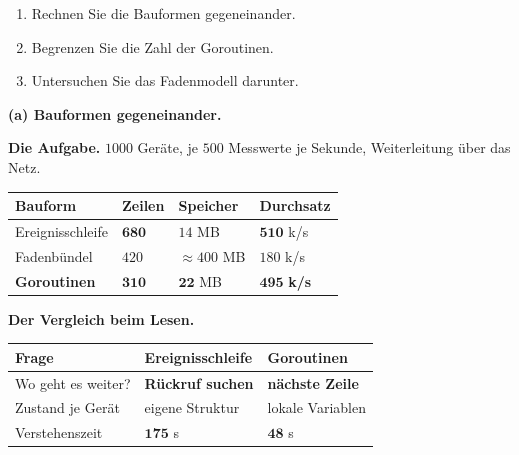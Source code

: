 \begin{aufgabe}
\begin{enumerate}[label=(\alph*)]
\item Rechnen Sie die Bauformen gegeneinander.
\item Begrenzen Sie die Zahl der Goroutinen.
\item Untersuchen Sie das Fadenmodell darunter.
\end{enumerate}

\loesung
\textbf{(a) Bauformen gegeneinander.}

\textbf{Die Aufgabe.} $1000$ Geräte, je $500$ Messwerte je Sekunde, Weiterleitung über das Netz.

\begin{center}
{\small
\renewcommand{\arraystretch}{1.45}
\begin{tabular}{@{}P{2.8cm}P{2.0cm}P{2.0cm}P{2.0cm}@{}}
\toprule
\textbf{Bauform} & \textbf{Zeilen} & \textbf{Speicher} & \textbf{Durchsatz}\\
\midrule
Ereignisschleife & $\mathbf{680}$ & \textcolor{gruen}{$14$ MB} & $\mathbf{510}$ k/s\\
Fadenbündel & $420$ & \textcolor{akzent}{$\approx400$ MB} & $180$ k/s\\
\textbf{Goroutinen} & $\mathbf{310}$ & $\mathbf{22}$ MB & $\mathbf{495}$ \textbf{k/s}\\
\bottomrule
\end{tabular}}
\end{center}

\begin{center}
\begin{minipage}{0.88\textwidth}
\end{minipage}
\end{center}

\textbf{Der Vergleich beim Lesen.}

\begin{center}
\renewcommand{\arraystretch}{1.45}
\begin{tabular}{@{}P{3.0cm}P{2.2cm}P{2.8cm}@{}}
\toprule
\textbf{Frage} & \textbf{Ereignis\-schleife} & \textbf{Goroutinen}\\
\midrule
Wo geht es weiter? & \textcolor{akzent}{\textbf{Rückruf suchen}} & \textcolor{gruen}{\textbf{nächste Zeile}}\\
Zustand je Gerät & \textcolor{akzent}{eigene Struktur} & \textcolor{gruen}{lokale Variablen}\\
Verstehenszeit & $\mathbf{175}$ s & \textcolor{gruen}{$\mathbf{48}$ s}\\
\bottomrule
\end{tabular}
\end{center}


\end{aufgabe}
